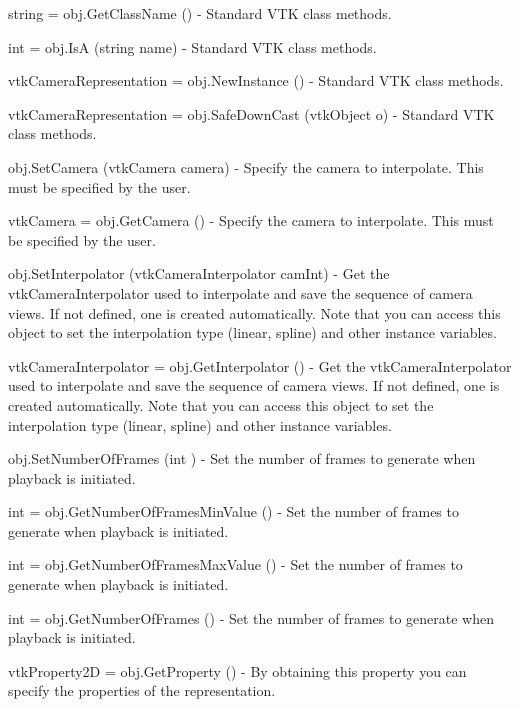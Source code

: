 \begin{DoxyItemize}
\item {\ttfamily string = obj.\-Get\-Class\-Name ()} -\/ Standard V\-T\-K class methods.  
\item {\ttfamily int = obj.\-Is\-A (string name)} -\/ Standard V\-T\-K class methods.  
\item {\ttfamily vtk\-Camera\-Representation = obj.\-New\-Instance ()} -\/ Standard V\-T\-K class methods.  
\item {\ttfamily vtk\-Camera\-Representation = obj.\-Safe\-Down\-Cast (vtk\-Object o)} -\/ Standard V\-T\-K class methods.  
\item {\ttfamily obj.\-Set\-Camera (vtk\-Camera camera)} -\/ Specify the camera to interpolate. This must be specified by the user.  
\item {\ttfamily vtk\-Camera = obj.\-Get\-Camera ()} -\/ Specify the camera to interpolate. This must be specified by the user.  
\item {\ttfamily obj.\-Set\-Interpolator (vtk\-Camera\-Interpolator cam\-Int)} -\/ Get the vtk\-Camera\-Interpolator used to interpolate and save the sequence of camera views. If not defined, one is created automatically. Note that you can access this object to set the interpolation type (linear, spline) and other instance variables.  
\item {\ttfamily vtk\-Camera\-Interpolator = obj.\-Get\-Interpolator ()} -\/ Get the vtk\-Camera\-Interpolator used to interpolate and save the sequence of camera views. If not defined, one is created automatically. Note that you can access this object to set the interpolation type (linear, spline) and other instance variables.  
\item {\ttfamily obj.\-Set\-Number\-Of\-Frames (int )} -\/ Set the number of frames to generate when playback is initiated.  
\item {\ttfamily int = obj.\-Get\-Number\-Of\-Frames\-Min\-Value ()} -\/ Set the number of frames to generate when playback is initiated.  
\item {\ttfamily int = obj.\-Get\-Number\-Of\-Frames\-Max\-Value ()} -\/ Set the number of frames to generate when playback is initiated.  
\item {\ttfamily int = obj.\-Get\-Number\-Of\-Frames ()} -\/ Set the number of frames to generate when playback is initiated.  
\item {\ttfamily vtk\-Property2\-D = obj.\-Get\-Property ()} -\/ By obtaining this property you can specify the properties of the representation.  

\end{DoxyItemize}
